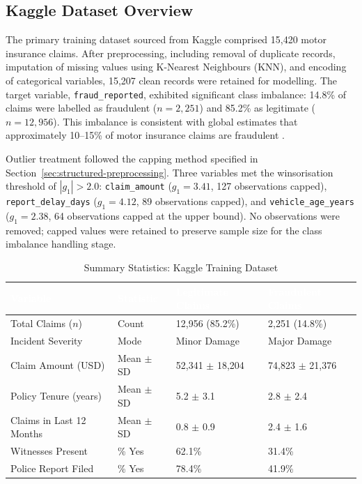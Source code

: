 \documentclass[12pt,a4paper,oneside]{report}
\numberwithin{equation}{chapter}
\renewcommand{\arraystretch}{1.6}
\begin{document}
\subsection{Kaggle Dataset Overview}

The primary training dataset sourced from Kaggle comprised 15,420 motor insurance claims. After
preprocessing, including removal of duplicate records, imputation of missing values using
K-Nearest Neighbours (KNN), and encoding of categorical variables, 15,207 clean records were
retained for modelling. The target variable, \texttt{fraud\_reported}, exhibited significant class
imbalance: 14.8\% of claims were labelled as fraudulent ($n = 2{,}251$) and 85.2\% as legitimate
($n = 12{,}956$). This imbalance is consistent with global estimates that approximately 10--15\%
of motor insurance claims are fraudulent \cite{mainafraud}.

\noindent Outlier treatment followed the capping method specified in
Section~\ref{sec:structured-preprocessing}. Three variables met the winsorisation threshold of
$|g_1| > 2.0$: \texttt{claim\_amount} ($g_1 = 3.41$, 127 observations capped),
\texttt{report\_delay\_days} ($g_1 = 4.12$, 89 observations capped), and
\texttt{vehicle\_age\_years} ($g_1 = 2.38$, 64 observations capped at the upper bound). No
observations were removed; capped values were retained to preserve sample size for the class
imbalance handling stage.

\begin{table}[H]
\centering
\caption{Summary Statistics: Kaggle Training Dataset}
\label{tab:eda_kaggle}
\renewcommand{\arraystretch}{1.4}
\begin{tabular}{L{4.2cm} C{2.4cm} C{3.4cm} C{3.4cm}}
\toprule
{}
\textcolor{white}{\textbf{Variable}} &
\textcolor{white}{\textbf{Statistic}} &
\textcolor{white}{\textbf{Legitimate Claims}} &
\textcolor{white}{\textbf{Fraudulent Claims}} \\
\midrule
{}
Total Claims ($n$)          & Count        & 12{,}956 (85.2\%) & 2{,}251 (14.8\%) \\
Incident Severity           & Mode         & Minor Damage      & Major Damage     \\
Claim Amount (USD)          & Mean $\pm$ SD & 52{,}341 $\pm$ 18{,}204 & 74{,}823 $\pm$ 21{,}376 \\
Policy Tenure (years)       & Mean $\pm$ SD & 5.2 $\pm$ 3.1    & 2.8 $\pm$ 2.4    \\
Claims in Last 12 Months    & Mean $\pm$ SD & 0.8 $\pm$ 0.9    & 2.4 $\pm$ 1.6    \\
Witnesses Present           & \% Yes       & 62.1\%            & 31.4\%           \\
Police Report Filed         & \% Yes       & 78.4\%            & 41.9\%           \\
\bottomrule
\end{tabular}
\end{table}
\end{document}
